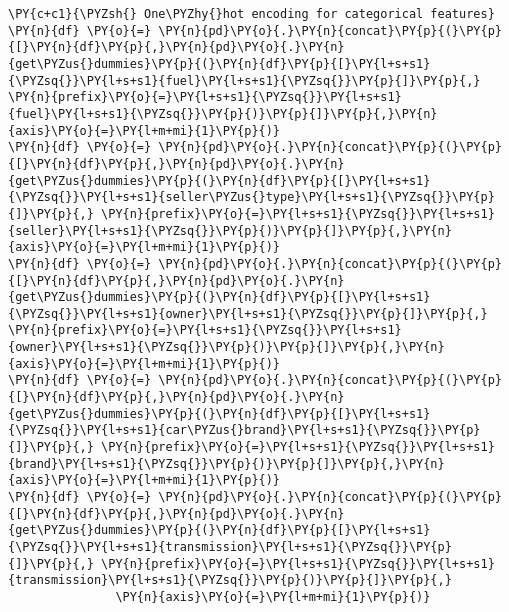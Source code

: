 \begin{tcolorbox}[breakable, size=fbox, boxrule=1pt, pad at break*=1mm,colback=cellbackground, colframe=cellborder]
\begin{Verbatim}[commandchars=\\\{\}]
\PY{c+c1}{\PYZsh{} One\PYZhy{}hot encoding for categorical features}
\PY{n}{df} \PY{o}{=} \PY{n}{pd}\PY{o}{.}\PY{n}{concat}\PY{p}{(}\PY{p}{[}\PY{n}{df}\PY{p}{,}\PY{n}{pd}\PY{o}{.}\PY{n}{get\PYZus{}dummies}\PY{p}{(}\PY{n}{df}\PY{p}{[}\PY{l+s+s1}{\PYZsq{}}\PY{l+s+s1}{fuel}\PY{l+s+s1}{\PYZsq{}}\PY{p}{]}\PY{p}{,} \PY{n}{prefix}\PY{o}{=}\PY{l+s+s1}{\PYZsq{}}\PY{l+s+s1}{fuel}\PY{l+s+s1}{\PYZsq{}}\PY{p}{)}\PY{p}{]}\PY{p}{,}\PY{n}{axis}\PY{o}{=}\PY{l+m+mi}{1}\PY{p}{)}
\PY{n}{df} \PY{o}{=} \PY{n}{pd}\PY{o}{.}\PY{n}{concat}\PY{p}{(}\PY{p}{[}\PY{n}{df}\PY{p}{,}\PY{n}{pd}\PY{o}{.}\PY{n}{get\PYZus{}dummies}\PY{p}{(}\PY{n}{df}\PY{p}{[}\PY{l+s+s1}{\PYZsq{}}\PY{l+s+s1}{seller\PYZus{}type}\PY{l+s+s1}{\PYZsq{}}\PY{p}{]}\PY{p}{,} \PY{n}{prefix}\PY{o}{=}\PY{l+s+s1}{\PYZsq{}}\PY{l+s+s1}{seller}\PY{l+s+s1}{\PYZsq{}}\PY{p}{)}\PY{p}{]}\PY{p}{,}\PY{n}{axis}\PY{o}{=}\PY{l+m+mi}{1}\PY{p}{)}
\PY{n}{df} \PY{o}{=} \PY{n}{pd}\PY{o}{.}\PY{n}{concat}\PY{p}{(}\PY{p}{[}\PY{n}{df}\PY{p}{,}\PY{n}{pd}\PY{o}{.}\PY{n}{get\PYZus{}dummies}\PY{p}{(}\PY{n}{df}\PY{p}{[}\PY{l+s+s1}{\PYZsq{}}\PY{l+s+s1}{owner}\PY{l+s+s1}{\PYZsq{}}\PY{p}{]}\PY{p}{,} \PY{n}{prefix}\PY{o}{=}\PY{l+s+s1}{\PYZsq{}}\PY{l+s+s1}{owner}\PY{l+s+s1}{\PYZsq{}}\PY{p}{)}\PY{p}{]}\PY{p}{,}\PY{n}{axis}\PY{o}{=}\PY{l+m+mi}{1}\PY{p}{)}
\PY{n}{df} \PY{o}{=} \PY{n}{pd}\PY{o}{.}\PY{n}{concat}\PY{p}{(}\PY{p}{[}\PY{n}{df}\PY{p}{,}\PY{n}{pd}\PY{o}{.}\PY{n}{get\PYZus{}dummies}\PY{p}{(}\PY{n}{df}\PY{p}{[}\PY{l+s+s1}{\PYZsq{}}\PY{l+s+s1}{car\PYZus{}brand}\PY{l+s+s1}{\PYZsq{}}\PY{p}{]}\PY{p}{,} \PY{n}{prefix}\PY{o}{=}\PY{l+s+s1}{\PYZsq{}}\PY{l+s+s1}{brand}\PY{l+s+s1}{\PYZsq{}}\PY{p}{)}\PY{p}{]}\PY{p}{,}\PY{n}{axis}\PY{o}{=}\PY{l+m+mi}{1}\PY{p}{)}
\PY{n}{df} \PY{o}{=} \PY{n}{pd}\PY{o}{.}\PY{n}{concat}\PY{p}{(}\PY{p}{[}\PY{n}{df}\PY{p}{,}\PY{n}{pd}\PY{o}{.}\PY{n}{get\PYZus{}dummies}\PY{p}{(}\PY{n}{df}\PY{p}{[}\PY{l+s+s1}{\PYZsq{}}\PY{l+s+s1}{transmission}\PY{l+s+s1}{\PYZsq{}}\PY{p}{]}\PY{p}{,} \PY{n}{prefix}\PY{o}{=}\PY{l+s+s1}{\PYZsq{}}\PY{l+s+s1}{transmission}\PY{l+s+s1}{\PYZsq{}}\PY{p}{)}\PY{p}{]}\PY{p}{,}
               \PY{n}{axis}\PY{o}{=}\PY{l+m+mi}{1}\PY{p}{)}
\end{Verbatim}
\end{tcolorbox}

